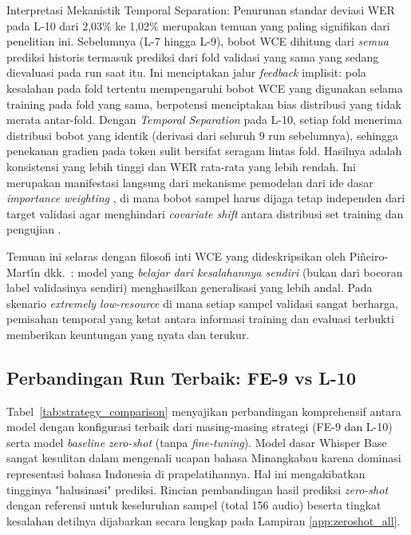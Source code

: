 Interpretasi Mekanistik Temporal Separation: Penurunan standar deviasi WER pada L-10 dari 2,03\% ke 1,02\% merupakan temuan yang paling signifikan dari penelitian ini. Sebelumnya (L-7 hingga L-9), bobot WCE dihitung dari \textit{semua} prediksi historis termasuk prediksi dari fold validasi yang sama yang sedang dievaluasi pada run saat itu. Ini menciptakan jalur \textit{feedback} implisit: pola kesalahan pada fold tertentu mempengaruhi bobot WCE yang digunakan selama training pada fold yang sama, berpotensi menciptakan bias distribusi yang tidak merata antar-fold. Dengan \textit{Temporal Separation} pada L-10, setiap fold menerima distribusi bobot yang identik (derivasi dari seluruh 9 run sebelumnya), sehingga penekanan gradien pada token sulit bersifat seragam lintas fold. Hasilnya adalah konsistensi yang lebih tinggi dan WER rata-rata yang lebih rendah. Ini merupakan manifestasi langsung dari mekanisme pemodelan dari ide dasar \textit{importance weighting} \cite{sugiyama2007covariate}, di mana bobot sampel harus dijaga tetap independen dari target validasi agar menghindari \textit{covariate shift} antara distribusi set training dan pengujian \cite{pineiromartin2024weighted, sugiyama2007covariate}.

Temuan ini selaras dengan filosofi inti WCE yang dideskripsikan oleh Pi\~{n}eiro-Mart{\'{\i}}n dkk.\ \cite{pineiromartin2024weighted}: model yang \textit{belajar dari kesalahannya sendiri} (bukan dari bocoran label validasinya sendiri) menghasilkan generalisasi yang lebih andal. Pada skenario \textit{extremely low-resource} di mana setiap sampel validasi sangat berharga, pemisahan temporal yang ketat antara informasi training dan evaluasi terbukti memberikan keuntungan yang nyata dan terukur.

\subsection{Perbandingan Run Terbaik: FE-9 vs L-10}

Tabel~\ref{tab:strategy_comparison} menyajikan perbandingan komprehensif antara model dengan konfigurasi terbaik dari masing-masing strategi (FE-9 dan L-10) serta model \textit{baseline} \textit{zero-shot} (tanpa \textit{fine-tuning}). Model dasar Whisper Base sangat kesulitan dalam mengenali ucapan bahasa Minangkabau karena dominasi representasi bahasa Indonesia di prapelatihannya. Hal ini mengakibatkan tingginya "halusinasi" prediksi. Rincian pembandingan hasil prediksi \textit{zero-shot} dengan referensi untuk keseluruhan sampel (total 156 audio) beserta tingkat kesalahan detilnya dijabarkan secara lengkap pada Lampiran \ref{app:zeroshot_all}.


